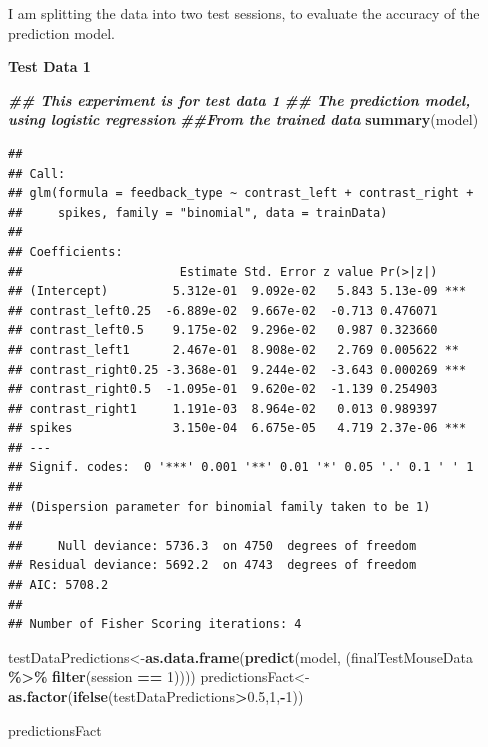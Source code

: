 \documentclass[
]{article}
\newenvironment{Shaded}{\begin{snugshade}}{\end{snugshade}}
\newcommand{\DecValTok}[1]{\textcolor[rgb]{0.00,0.00,0.81}{#1}}
\newcommand{\DocumentationTok}[1]{\textcolor[rgb]{0.56,0.35,0.01}{\textbf{\textit{#1}}}}
\newcommand{\FloatTok}[1]{\textcolor[rgb]{0.00,0.00,0.81}{#1}}
\newcommand{\FunctionTok}[1]{\textcolor[rgb]{0.13,0.29,0.53}{\textbf{#1}}}
\newcommand{\NormalTok}[1]{#1}
\newcommand{\OtherTok}[1]{\textcolor[rgb]{0.56,0.35,0.01}{#1}}
\newcommand{\SpecialCharTok}[1]{\textcolor[rgb]{0.81,0.36,0.00}{\textbf{#1}}}
\begin{document}
I am splitting the data into two test sessions, to evaluate the accuracy
of the prediction model.

\textbf{Test Data 1}

\begin{Shaded}
\begin{Highlighting}[]
\DocumentationTok{\#\# This experiment is for test data 1}
\DocumentationTok{\#\# The prediction model, using logistic regression }
\DocumentationTok{\#\#From the trained data}
\FunctionTok{summary}\NormalTok{(model)}
\end{Highlighting}
\end{Shaded}

\begin{verbatim}
## 
## Call:
## glm(formula = feedback_type ~ contrast_left + contrast_right + 
##     spikes, family = "binomial", data = trainData)
## 
## Coefficients:
##                      Estimate Std. Error z value Pr(>|z|)    
## (Intercept)         5.312e-01  9.092e-02   5.843 5.13e-09 ***
## contrast_left0.25  -6.889e-02  9.667e-02  -0.713 0.476071    
## contrast_left0.5    9.175e-02  9.296e-02   0.987 0.323660    
## contrast_left1      2.467e-01  8.908e-02   2.769 0.005622 ** 
## contrast_right0.25 -3.368e-01  9.244e-02  -3.643 0.000269 ***
## contrast_right0.5  -1.095e-01  9.620e-02  -1.139 0.254903    
## contrast_right1     1.191e-03  8.964e-02   0.013 0.989397    
## spikes              3.150e-04  6.675e-05   4.719 2.37e-06 ***
## ---
## Signif. codes:  0 '***' 0.001 '**' 0.01 '*' 0.05 '.' 0.1 ' ' 1
## 
## (Dispersion parameter for binomial family taken to be 1)
## 
##     Null deviance: 5736.3  on 4750  degrees of freedom
## Residual deviance: 5692.2  on 4743  degrees of freedom
## AIC: 5708.2
## 
## Number of Fisher Scoring iterations: 4
\end{verbatim}

\begin{Shaded}
\begin{Highlighting}[]
\NormalTok{testDataPredictions}\OtherTok{\textless{}{-}}\FunctionTok{as.data.frame}\NormalTok{(}\FunctionTok{predict}\NormalTok{(model, (finalTestMouseData }\SpecialCharTok{\%\textgreater{}\%} \FunctionTok{filter}\NormalTok{(session }\SpecialCharTok{==} \DecValTok{1}\NormalTok{))))}
\NormalTok{predictionsFact}\OtherTok{\textless{}{-}} \FunctionTok{as.factor}\NormalTok{(}\FunctionTok{ifelse}\NormalTok{(testDataPredictions}\SpecialCharTok{\textgreater{}}\FloatTok{0.5}\NormalTok{,}\DecValTok{1}\NormalTok{,}\SpecialCharTok{{-}}\DecValTok{1}\NormalTok{))}


\NormalTok{predictionsFact}
\end{Highlighting}
\end{Shaded}
\end{document}
